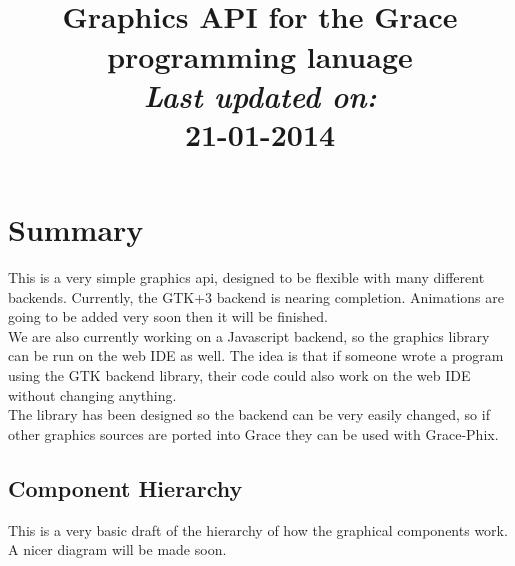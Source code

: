 \documentclass{article}
\title {
    \vspace{2in}
    \textmd{\textbf{\gphixTitle}}\\
    \normalsize\vspace{0.1in}\small{Graphics API for the Grace programming lanuage}\\
    \vspace{0.1in}\large{\textit{Last updated on:\\}}
    \vspace{0.1in}\textbf{21-01-2014}
    \vspace{3in}
}
\author{\textbf{\gphixAuthorName}}
\date{} %
\begin{document}
\grace

\maketitle



\newpage
\tableofcontents
\newpage



\section{Summary}

This is a very simple graphics api, designed to be flexible with many different backends.
Currently, the GTK+3 backend is nearing completion. Animations are going to be added very soon
then it will be finished.\\

We are also currently working on a Javascript backend, so the graphics library can be run on
the web IDE as well. The idea is that if someone wrote a program using the GTK backend library,
their code could also work on the web IDE without changing anything.\\

The library has been designed so the backend can be very easily changed, so if other graphics
sources are ported into Grace they can be used with Grace-Phix.\\


\subsection{Component Hierarchy}
This is a very basic draft of the hierarchy of how the graphical components work.
A nicer diagram will be made soon.

\vspace{0.5in}
\end{document}
